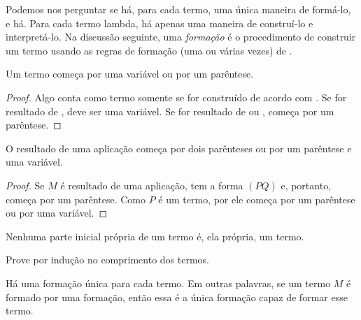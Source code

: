 \documentclass[../../../include/open-logic-section]{subfiles}
\begin{document}

Podemos nos perguntar se há, para cada termo, uma única maneira de formá-lo,
e há. Para cada termo lambda, há apenas uma maneira de construí-lo e
interpretá-lo. Na discussão seguinte, uma \emph{formação} é o procedimento
de construir um termo usando as regras de formação (uma ou várias vezes) de
.

\begin{lem}
Um termo começa por uma variável ou por um parêntese.
\end{lem}

\begin{proof}
Algo conta como termo somente se for construído de acordo com
. Se for resultado de
, deve ser uma variável. Se for resultado de
 ou , começa por um
parêntese.
\end{proof}

\begin{lem}
O resultado de uma aplicação começa por dois parênteses ou por um parêntese
e uma variável.
\end{lem}

\begin{proof}
Se $M$ é resultado de uma aplicação, tem a forma $(PQ)$ e, portanto, começa
por um parêntese. Como $P$ é um termo, por  ele começa
por um parêntese ou por uma variável.
\end{proof}

\begin{lem}
Nenhuma parte inicial própria de um termo é, ela própria, um termo.
\end{lem}

\begin{prob}
Prove  por indução no comprimento dos
termos.
\end{prob}

\begin{prop} 
Há uma formação única para cada termo. Em outras palavras, se um termo $M$
é formado por uma formação, então essa é a única formação capaz de formar
esse termo.
\end{prop}
\end{document}
